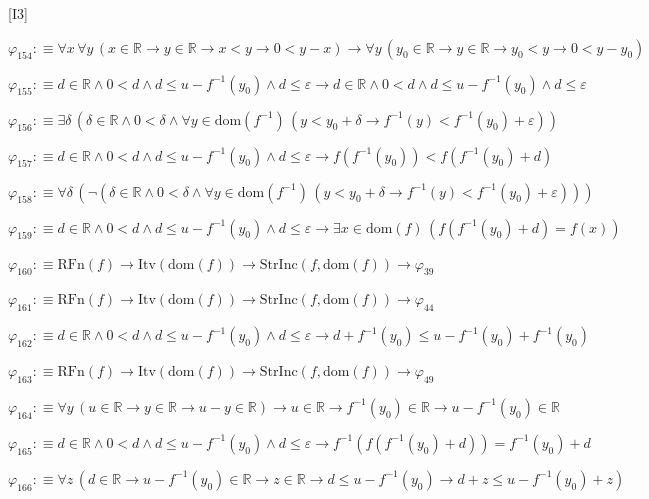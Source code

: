 \begin{fullproof}{[I3]}
\begin{abbrevlist}
\item $\varphi_{154} :\equiv \forall x\,\forall y\,(x \in \mathbb{R} \to y \in \mathbb{R} \to x < y \to 0 < y - x) \to \forall y\,(y_{0} \in \mathbb{R} \to y \in \mathbb{R} \to y_{0} < y \to 0 < y - y_{0})$
\item $\varphi_{155} :\equiv d \in \mathbb{R} \land 0 < d \land d \leq u - f^{-1}(y_{0}) \land d \leq \varepsilon \to d \in \mathbb{R} \land 0 < d \land d \leq u - f^{-1}(y_{0}) \land d \leq \varepsilon$
\item $\varphi_{156} :\equiv \exists \delta\,(\delta \in \mathbb{R} \land 0 < \delta \land \forall y \in \mathrm{dom}(f^{-1})\,(y < y_{0} + \delta \to f^{-1}(y) < f^{-1}(y_{0}) + \varepsilon))$
\item $\varphi_{157} :\equiv d \in \mathbb{R} \land 0 < d \land d \leq u - f^{-1}(y_{0}) \land d \leq \varepsilon \to f(f^{-1}(y_{0})) < f(f^{-1}(y_{0}) + d)$
\item $\varphi_{158} :\equiv \forall \delta\,(\neg (\delta \in \mathbb{R} \land 0 < \delta \land \forall y \in \mathrm{dom}(f^{-1})\,(y < y_{0} + \delta \to f^{-1}(y) < f^{-1}(y_{0}) + \varepsilon)))$
\item $\varphi_{159} :\equiv d \in \mathbb{R} \land 0 < d \land d \leq u - f^{-1}(y_{0}) \land d \leq \varepsilon \to \exists x \in \mathrm{dom}(f)\,(f(f^{-1}(y_{0}) + d) = f(x))$
\item $\varphi_{160} :\equiv \mathrm{RFn}(f) \to \mathrm{Itv}(\mathrm{dom}(f)) \to \mathrm{StrInc}(f,\mathrm{dom}(f)) \to \varphi_{39}$
\item $\varphi_{161} :\equiv \mathrm{RFn}(f) \to \mathrm{Itv}(\mathrm{dom}(f)) \to \mathrm{StrInc}(f,\mathrm{dom}(f)) \to \varphi_{44}$
\item $\varphi_{162} :\equiv d \in \mathbb{R} \land 0 < d \land d \leq u - f^{-1}(y_{0}) \land d \leq \varepsilon \to d + f^{-1}(y_{0}) \leq u - f^{-1}(y_{0}) + f^{-1}(y_{0})$
\item $\varphi_{163} :\equiv \mathrm{RFn}(f) \to \mathrm{Itv}(\mathrm{dom}(f)) \to \mathrm{StrInc}(f,\mathrm{dom}(f)) \to \varphi_{49}$
\item $\varphi_{164} :\equiv \forall y\,(u \in \mathbb{R} \to y \in \mathbb{R} \to u - y \in \mathbb{R}) \to u \in \mathbb{R} \to f^{-1}(y_{0}) \in \mathbb{R} \to u - f^{-1}(y_{0}) \in \mathbb{R}$
\item $\varphi_{165} :\equiv d \in \mathbb{R} \land 0 < d \land d \leq u - f^{-1}(y_{0}) \land d \leq \varepsilon \to f^{-1}(f(f^{-1}(y_{0}) + d)) = f^{-1}(y_{0}) + d$
\item $\varphi_{166} :\equiv \forall z\,(d \in \mathbb{R} \to u - f^{-1}(y_{0}) \in \mathbb{R} \to z \in \mathbb{R} \to d \leq u - f^{-1}(y_{0}) \to d + z \leq u - f^{-1}(y_{0}) + z)$

\end{abbrevlist}
\end{fullproof}
